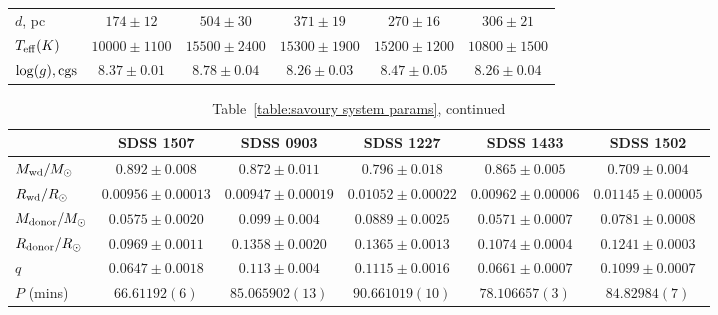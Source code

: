 \begin{landscape}
\begin{table}
\begin{tabular}{lccccc}
                \hline
                $d$, pc                     & $174\pm12$            & $504\pm30$            & $371\pm19$            & $270\pm16$            & $306\pm21$            \\
                $T_{\rm eff} (K)$           & $10000\pm1100$        & $15500\pm2400$        & $15300\pm1900$        & $15200\pm1200$        & $10800\pm1500$        \\
                $\log(g), {\rm cgs}$        & $8.37\pm0.01$         & $8.78\pm0.04$         & $8.26\pm0.03$         & $8.47\pm0.05$         & $8.26\pm0.04$         \\
                \hline
                \hline
            \end{tabular}
        \end{table}

        \begin{table}
            \caption{Table~\ref{table:savoury system params}, continued}
            \label{table:savoury system params cont 2}
            \begin{tabular}{lccccc}
                \hline
                ~                           & {\bf SDSS 1507}       & {\bf SDSS 0903}       & {\bf SDSS 1227}       & {\bf SDSS 1433}       & {\bf SDSS 1502}       \\
                \hline
                \hline
                $M_{\rm wd}/M_{\odot}$      & $0.892\pm0.008$       & $0.872\pm0.011$       & $0.796\pm0.018$       & $0.865\pm0.005$       & $0.709\pm0.004$       \\
                $R_{\rm wd}/R_{\odot}$      & $0.00956\pm0.00013$   & $0.00947\pm0.00019$   & $0.01052\pm0.00022$   & $0.00962\pm0.00006$   & $0.01145\pm0.00005$   \\
                $M_{\rm donor}/M_{\odot}$   & $0.0575\pm0.0020$     & $0.099\pm0.004$       & $0.0889\pm0.0025$     & $0.0571\pm0.0007$     & $0.0781\pm0.0008$     \\
                $R_{\rm donor}/R_{\odot}$   & $0.0969\pm0.0011$     & $0.1358\pm0.0020$     & $0.1365\pm0.0013$     & $0.1074\pm0.0004$     & $0.1241\pm0.0003$     \\
                $q$                         & $0.0647\pm0.0018$     & $0.113\pm0.004$       & $0.1115\pm0.0016$     & $0.0661\pm0.0007$     & $0.1099\pm0.0007$     \\
                \hline
                $P$ (mins)                  & $66.61192(6)$         & $85.065902(13)$       & $90.661019(10)$       & $78.106657(3)$        & $84.82984(7)$         \\

\end{tabular}
\end{table}
\end{landscape}
